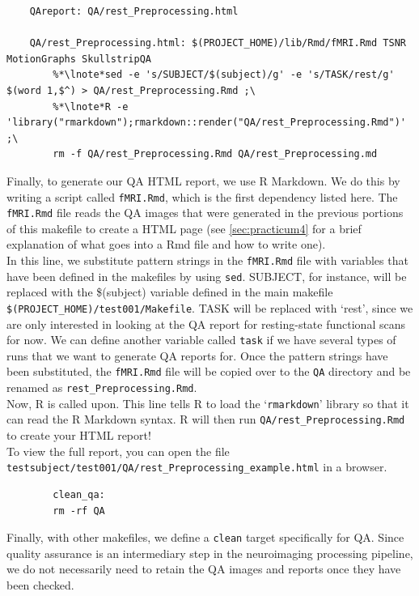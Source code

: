 \begin{lstlisting}
	QAreport: QA/rest_Preprocessing.html 

	QA/rest_Preprocessing.html: $(PROJECT_HOME)/lib/Rmd/fMRI.Rmd TSNR MotionGraphs SkullstripQA
		%*\lnote*sed -e 's/SUBJECT/$(subject)/g' -e 's/TASK/rest/g' $(word 1,$^) > QA/rest_Preprocessing.Rmd ;\
		%*\lnote*R -e 'library("rmarkdown");rmarkdown::render("QA/rest_Preprocessing.Rmd")' ;\
		rm -f QA/rest_Preprocessing.Rmd QA/rest_Preprocessing.md
\end{lstlisting}


Finally, to generate our QA HTML report, we use R Markdown. We do this by writing a script called \texttt{fMRI.Rmd}, which is the first dependency listed here. The \texttt{fMRI.Rmd} file reads the QA images that were generated in the previous portions of this makefile to create a HTML page (see \autoref{sec:practicum4} for a brief explanation of what goes into a Rmd file and how to write one). \\
 In this line, we substitute pattern strings in the \texttt{fMRI.Rmd} file with variables that have been defined in the makefiles by using \texttt{sed}. SUBJECT, for instance, will be replaced with the \$(subject) variable defined in the main makefile \texttt{\$(PROJECT\_HOME)/test001/Makefile}. TASK will be replaced with `rest', since we are only interested in looking at the QA report for resting-state functional scans for now. We can define another variable called \texttt{task} if we have several types of runs that we want to generate QA reports for. Once the pattern strings have been substituted, the \texttt{fMRI.Rmd} file will be copied over to the \texttt{QA} directory and be renamed as \texttt{rest\_Preprocessing.Rmd}. \\
 Now, R is called upon. This line tells R to load the `\texttt{rmarkdown}' library so that it can read the R Markdown syntax. R will then run \texttt{QA/rest\_Preprocessing.Rmd} to create your HTML report! \\

To view the full report, you can open the file \texttt{testsubject/test001/QA/rest_Preprocessing_example.html} in a browser.


\begin{lstlisting}
		clean_qa: 
		rm -rf QA
\end{lstlisting}

Finally, with other makefiles, we define a \texttt{clean} target specifically for QA. Since quality assurance is an intermediary step in the neuroimaging processing pipeline, we do not necessarily need to retain the QA images and reports once they have been checked.


